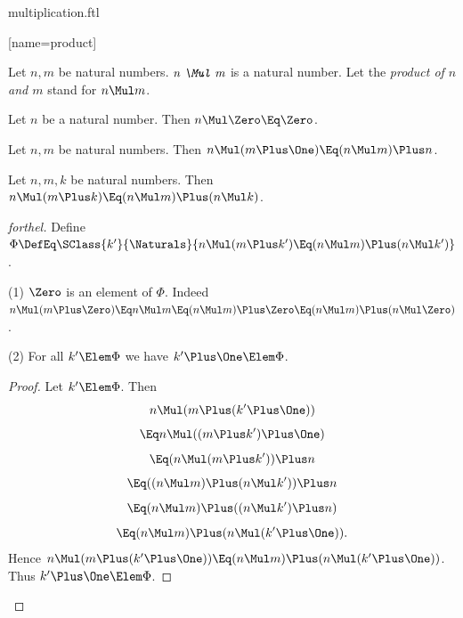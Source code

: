 \documentclass{stex}
\begin{document}
\begin{smodule}{multiplication.ftl}


[name=product]{\,\cdot\,}


\begin{signature*}[forthel,for=Mul]
  Let $n, m$ be natural numbers.
  $\emph{n \Mul m}$ is a natural number.
  Let the \emph{product of $n$ and $m$} stand for $n \Mul m$.
\end{signature*}

\begin{axiom*}[forthel,for=Mul]
  Let $n$ be a natural number.
  Then $n \Mul \Zero \Eq \Zero$.
\end{axiom*}

\begin{axiom*}[forthel,for=Mul]
  Let $n, m$ be natural numbers.
  Then $n \Mul (m \Plus \One) \Eq (n \Mul m) \Plus n$.
\end{axiom*}

\begin{proposition*}[forthel,name=left-distributivity of multiplication over addition]
  Let $n, m, k$ be natural numbers.
  Then $n \Mul (m \Plus k) \Eq (n \Mul m) \Plus (n \Mul k)$.
\end{proposition*}
\begin{proof}[forthel]
  Define $\Phi \DefEq \SClass{k'}{\Naturals}{n \Mul (m \Plus k') \Eq (n \Mul m) \Plus (n \Mul k')}$.

  (1) $\Zero$ is an element of $\Phi$.
  Indeed $n \Mul (m \Plus \Zero)
    \Eq n \Mul m
    \Eq (n \Mul m) \Plus \Zero
    \Eq (n \Mul m) \Plus (n \Mul \Zero)$.

  (2) For all $k' \Elem \Phi$ we have $k' \Plus \One \Elem \Phi$. 
  \begin{proof}
    Let $k'\Elem \Phi$.
    Then
    \[  n \Mul (m \Plus (k' \Plus \One))                  \]
    \[    \Eq n \Mul ((m \Plus k') \Plus \One)              \]
    \[    \Eq (n \Mul (m \Plus k')) \Plus n              \]
    \[    \Eq ((n \Mul m) \Plus (n \Mul k')) \Plus n    \]
    \[    \Eq (n \Mul m) \Plus ((n \Mul k') \Plus n)    \]
    \[    \Eq (n \Mul m) \Plus (n \Mul (k' \Plus \One)).   \]
    Hence $n \Mul (m \Plus (k' \Plus \One)) \Eq (n \Mul m) \Plus (n \Mul (k' \Plus \One))$.
    Thus $k' \Plus \One \Elem \Phi$.
  \end{proof}


\end{proof}
\end{smodule}
\end{document}
